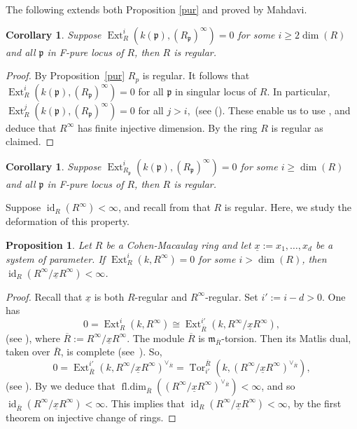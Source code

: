 \documentclass[12pt,reqno]{amsart}
\newtheorem{corollary}[theorem]{Corollary}
\newtheorem{proposition}[theorem]{Proposition}
\theoremstyle{definition}
\theoremstyle{remark}
\theoremstyle{cited}
\theoremstyle{remark}
\theoremstyle{citeddef}
\DeclareMathOperator{\Tor}{Tor}
\DeclareMathOperator{\id}{id}
\newcommand{\fm}{\mathfrak{m}}
\newcommand{\fp}{\mathfrak{p}}
\begin{document}
	
	The following extends both Proposition \ref{pur} and \cite[5.17, 5.18]{Elham} proved by Mahdavi.
	\begin{corollary}\label{purp}
		Suppose  
		\(
		\operatorname{Ext}_R^i(k(\fp), (R_{\fp})^\infty) = 0
		\)
		for some \(i \geq 2\dim(R)\) and all $\fp$ in F-pure locus of $R$, then \(R\) is regular.
	\end{corollary}
	
	\begin{proof} 
		By {Proposition}~\ref{pur} $R_p$ is regular. It follows that \(
		\operatorname{Ext}_R^i(k(\fp), (R_{\fp})^\infty) = 0
		\) for all $\fp$ in singular locus of $R$. %
		In particular,  \(
		\operatorname{Ext}_R^j(k(\fp), (R_{\fp})^\infty) = 0
		\) for all $j>i,$  (see (\cite[Theorem 1.3]{IYENGAR}). These   enable  us to use \cite[Theorem VI.9]{sc3}, and deduce that \(R^\infty\) has finite injective dimension. 
		By \cite[Example 3.17(i)]{Ryo} the ring $R$ is regular as claimed.  
	\end{proof}\begin{corollary}\label{purp2}
		Suppose  
		\(
		\operatorname{Ext}_{R_{\fp}}^i(k(\fp), (R_{\fp})^\infty) = 0
		\)
		for some \(i \geq  \dim(R)\) and all $\fp$ in F-pure locus of $R$, then \(R\) is regular.
	\end{corollary}
	Suppose \(\id_R(R^\infty)<\infty\), and recall from 
	\cite[Example 3.17(i)]{Ryo} that \(R\) is regular. Here, we study the deformation of this property.
	
	\begin{proposition}
		Let \(R\) be a Cohen-Macaulay  ring and let  $\underline{x}:=x_1,\ldots,x_d$ be a system of parameter. If 
		\(
		\operatorname{Ext}_R^i(k, R^\infty) = 0
		\)
		for some \(i > \dim(R)\), then \( \id_{{R}}(R^\infty/\underline{x} R^\infty)<\infty\).
	\end{proposition}
	
	\begin{proof}
		Recall that $\underline{x}$ is both $R$-regular and $R^\infty$-regular. Set $i':=i-d>0$. One has 
		$$
		0=\operatorname{Ext}_R^i(k, R^\infty)\cong  \operatorname{Ext}_{\overline{R}}^{i'}(k, R^\infty/\underline{x} R^\infty),$$(see \cite[Theorem 10.77]{Rot}),
		where $\overline{R}:=R^\infty/\underline{x} R^\infty$. The module $\overline{R}$ is $\fm_{\overline{R}}$-torsion. Then its Matlis dual, taken over $\overline{R}$, is complete (see~\cite[\S 4.2, Lemma]{sim}). So, 
		$$0=\operatorname{Ext}_{\overline{R}}^{i'}(k, R^\infty/\underline{x} R^\infty)^{\vee_{\overline{R}}}=\Tor^{\overline{R}}_{i'}(k, (R^\infty/\underline{x} R^\infty)^{\vee_{\overline{R}}}),$$(see  \cite[\S 4.1]{sim}).
		By \cite[Proposition 2.1]{sim} we deduce that $\operatorname{fl.dim}_{\overline{R}}((R^\infty/\underline{x} R^\infty)^{\vee_{\overline{R}}})<\infty$,  and so $\id_{\overline{R}}(R^\infty/\underline{x} R^\infty)<\infty$. This implies that $\id_{R}(R^\infty/\underline{x} R^\infty) <\infty$, by the first theorem on injective change of rings. 
	\end{proof}
	
\end{document}
